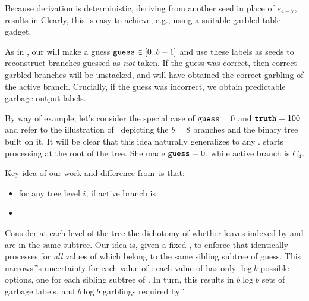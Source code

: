  Because derivation is deterministic, deriving from another seed in place of $s_{4-7}$, results in 
Clearly, this is easy to achieve, e.g., using a suitable garbled table gadget.








 As in \HK, our \E will make a guess $\mathtt{guess}\in[0..b-1]$ and use these labels as seeds to reconstruct branches guessed as {\em not} taken.  If the guess was correct, then correct garbled branches will be unstacked, and \E will have obtained the correct garbling of the active branch.  Crucially, if the guess was incorrect, we obtain predictable garbage output labels.



By way of example, let's consider the special case of $\mathtt{guess}=0$ and $\mathtt{truth} = 100$ and refer to the illustration of~ depicting the $b=8$ branches and the binary tree built on it.  It will be clear that this idea naturally generalizes to any \guess.  \E starts processing at the root of the tree.  She made $\mathtt{guess} = 0$, while active branch is $C_4$.  



 Key idea of our work and difference from~\HK is that:
\begin{itemize}
	\item for any tree level $i$, if active branch is 
	\item 
\end{itemize}




 Consider at each level of the tree the dichotomy of whether leaves indexed by \guess and \truth are in the same subtree. Our idea is, given a fixed \guess, to  enforce that \E identically processes \guess for {\em all} values of \truth which belong to the same sibling subtree of guess. This narrows \G’s uncertainty for each value of \guess: each value of \guess has only $\log b$ possible \truth options, one for each sibling subtree of \guess.  In turn, this results in $b\log b$  sets of garbage labels, and $b\log b$ garblings required by \G. 


\medskip



